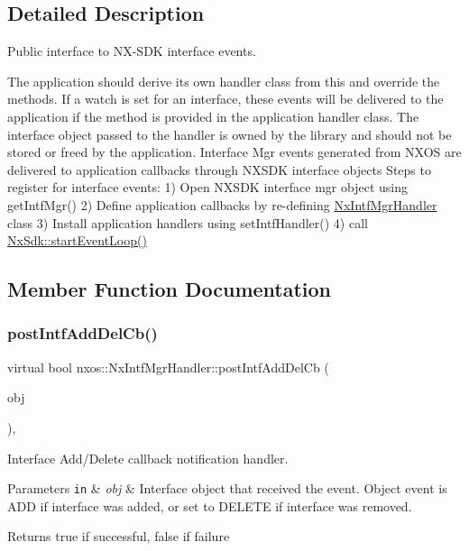 \subsection{Detailed Description}
Public interface to N\+X-\/\+S\+DK interface events. 

The application should derive its own handler class from this and override the methods. If a watch is set for an interface, these events will be delivered to the application if the method is provided in the application handler class. The interface object passed to the handler is owned by the library and should not be stored or freed by the application. Interface Mgr events generated from N\+X\+OS are delivered to application callbacks through N\+X\+S\+DK interface objects Steps to register for interface events\+: 1) Open N\+X\+S\+DK interface mgr object using get\+Intf\+Mgr() 2) Define application callbacks by re-\/defining \mbox{\hyperlink{classnxos_1_1_nx_intf_mgr_handler}{Nx\+Intf\+Mgr\+Handler}} class 3) Install application handlers using set\+Intf\+Handler() 4) call \mbox{\hyperlink{classnxos_1_1_nx_sdk_a75ca70643fe325ddf0eea62c1f8c4cc8}{Nx\+Sdk\+::start\+Event\+Loop()}} 

\subsection{Member Function Documentation}
\mbox{\label{classnxos_1_1_nx_intf_mgr_handler_afe79bff5ee5b314111e2ce7c7226e73f}} 
\subsubsection{\texorpdfstring{post\+Intf\+Add\+Del\+Cb()}{postIntfAddDelCb()}}
{\footnotesize\ttfamily virtual bool nxos\+::\+Nx\+Intf\+Mgr\+Handler\+::post\+Intf\+Add\+Del\+Cb (\begin{DoxyParamCaption}\item[{\mbox{\hyperlink{classnxos_1_1_nx_intf}{Nx\+Intf}} $\ast$}]{obj }\end{DoxyParamCaption})\hspace{0.3cm}{\ttfamily [inline]}, {\ttfamily [virtual]}}

Interface Add/\+Delete callback notification handler. 
\begin{DoxyParams}[1]{Parameters}
\mbox{\tt in}  & {\em obj} & Interface object that received the event. Object event is A\+DD if interface was added, or set to D\+E\+L\+E\+TE if interface was removed. \\
\hline
\end{DoxyParams}
\begin{DoxyReturn}{Returns}
true if successful, false if failure
\end{DoxyReturn}

